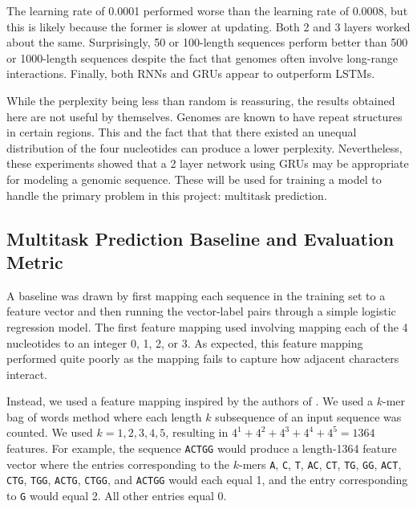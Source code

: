 \documentclass{article} %
\begin{document}
The learning rate of 0.0001 performed worse than the learning rate of 0.0008, but this is likely because the former is slower at updating. Both 2 and 3 layers worked about the same. Surprisingly, 50 or 100-length sequences perform better than 500 or 1000-length sequences despite the fact that genomes often involve long-range interactions. Finally, both RNNs and GRUs appear to outperform LSTMs.

While the perplexity being less than random is reassuring, the results obtained here are not useful by themselves. Genomes are known to have repeat structures in certain regions. This and the fact that that there existed an unequal distribution of the four nucleotides can produce a lower perplexity. Nevertheless, these experiments showed that a 2 layer network using GRUs may be appropriate for modeling a genomic sequence. These will be used for training a model to handle the primary problem in this project: multitask prediction.

\subsection{Multitask Prediction Baseline and Evaluation Metric}

A baseline was drawn by first mapping each sequence in the training set to a feature vector and then running the vector-label pairs through a simple logistic regression model. The first feature mapping used involving mapping each of the 4 nucleotides to an integer 0, 1, 2, or 3. As expected, this feature mapping performed quite poorly as the mapping fails to capture how adjacent characters interact.

Instead, we used a feature mapping inspired by the authors of \cite{quang2015danq}. We used a $k$-mer bag of words method where each length $k$ subsequence of an input sequence was counted. We used $k = 1, 2, 3, 4, 5$, resulting in $4^1 + 4^2+4^3+4^4+4^5 = 1364$ features. For example, the sequence \texttt{ACTGG} would produce a length-1364 feature vector where the entries corresponding to the $k$-mers \texttt{A}, \texttt{C}, \texttt{T}, \texttt{AC}, \texttt{CT}, \texttt{TG}, \texttt{GG}, \texttt{ACT}, \texttt{CTG}, \texttt{TGG}, \texttt{ACTG}, \texttt{CTGG}, and \texttt{ACTGG} would each equal 1, and the entry corresponding to \texttt{G} would equal 2. All other entries equal 0.
\end{document}
